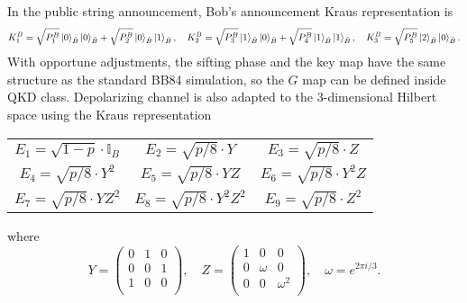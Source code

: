 \documentclass{article}
\begin{document}
        In the public string announcement, Bob's announcement Kraus representation is 
        \[ K^B_1 = \sqrt{P^B_1}\ket{0}_{\tilde{B}}\ket{0}_{\bar{B}} + \sqrt{P^B_2}\ket{0}_{\tilde{B}}\ket{1}_{\bar{B}}, \quad K^B_2 = \sqrt{P^B_3}\ket{1}_{\tilde{B}}\ket{0}_{\bar{B}} + \sqrt{P^B_4}\ket{1}_{\tilde{B}}\ket{1}_{\bar{B}}, \quad K^B_3 = \sqrt{P^B_5}\ket{2}_{\tilde{B}}\ket{0}_{\bar{B}}. \]
        With opportune adjustments, the sifting phase and the key map have the same structure as the standard BB84 simulation, so the \(G\) map can be defined inside \textrm{QKD} class.
        Depolarizing channel is also adapted to the 3-dimensional Hilbert space using the Kraus representation \cite{Ramzan_2011}
        \\
        \begin{center}
            \begin{tabular}{ccc}
                \(E_1=\sqrt{1-p}\cdot \mathbb{I}_B\) & 
                \(E_2=\sqrt{p/8}\cdot Y\) & 
                \(E_3=\sqrt{p/8}\cdot Z\)\\
                \(E_4=\sqrt{p/8}\cdot Y^2\) & 
                \(E_5=\sqrt{p/8}\cdot YZ\) & 
               \( E_6=\sqrt{p/8}\cdot Y^2Z\)\\
                \(E_7=\sqrt{p/8}\cdot YZ^2\) & 
                \(E_8=\sqrt{p/8}\cdot Y^2Z^2\) & 
                \(E_9=\sqrt{p/8}\cdot Z^2\)
            \end{tabular}
        \end{center}
        where 
        \[
            Y = \left(\begin{matrix}
                0 & 1 & 0 \\ 
                0 & 0 & 1 \\ 
                1 & 0 & 0 \\ 
            \end{matrix}\right), \quad
            Z = \left(\begin{matrix}
                1 & 0 & 0 \\ 
                0 & \omega & 0 \\ 
                0 & 0 & \omega^2 \\ 
            \end{matrix}\right),\quad \omega=e^{2\pi i/3}.
        \]
        
\end{document}
